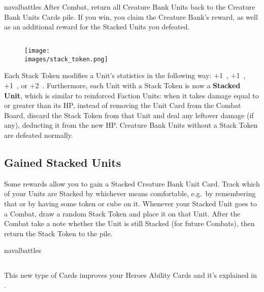 \begin{multicols*}{2}
\begin{expansion}[before=\vspace*{-11mm}]{navalbattles}
    After Combat, return all Creature Bank Units back to the Creature Bank Units Cards pile.
    If you win, you claim the Creature Bank's reward, as well as an additional reward for the Stacked Units you defeated.

    \subsection*{}
        \setlength\intextsep{0pt}
        \setlength\columnsep{1em}
        \begin{wrapfigure}{r}{0.2\linewidth}
            \texttt{[image: \\images/stack\_token.png]}
        \end{wrapfigure}
    Each Stack Token modifies a Unit's statistics in the following way: +1~, +1~, +1~, or +2~.
    Furthermore, each Unit with a Stack Token is now a \textbf{Stacked Unit}, which is similar to reinforced Faction Units: when it takes damage equal to or greater than its HP, instead of removing the Unit Card from the Combat Board, discard the Stack Token from that Unit and deal any leftover damage (if any), deducting it from the new HP.
    Creature Bank Units without a Stack Token are defeated normally.

    \subsection*{Gained Stacked Units}
    Some rewards allow you to gain a Stacked Creature Bank Unit Card.
    Track which of your Units are Stacked by whichever means comfortable, e.g.~by remembering that or by having some token or cube on it.
    Whenever your Stacked Unit goes to a Combat, draw a random Stack Token and place it on that Unit.
    After the Combat take a note whether the Unit is still Stacked (for future Combats), then return the Stack Token to the pile.
\end{expansion}

\vspace*{1em}
\begin{expansion}[before=\vspace*{-11mm}]{navalbattles}
    \subsection*{}
    This new type of Cards improves your Heroes Ability Cards and it's explained in .


\end{expansion}
\end{multicols*}
